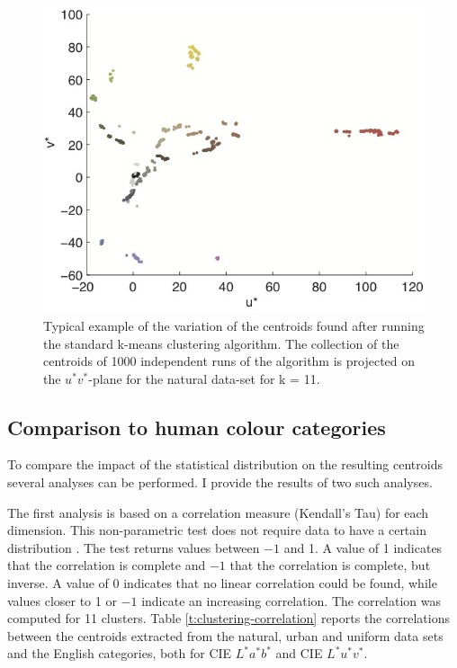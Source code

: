 \begin{figure}[htbp]
\centering
\includegraphics[width=.7\textwidth]{./experiments/figures/clustering-first.jpg}
\caption[Example of the variation of the centroids found by the
k-means clustering algorithm]{Typical example of the variation of the
  centroids found after running the standard k-means clustering
  algorithm. The collection of the centroids of 1000 independent runs
  of the algorithm is projected on the $u^*v^*$-plane for the natural
  data-set for k = 11.}
\label{f:clustering-first}
\end{figure}

\subsection{Comparison to human colour categories}

To compare the impact of the statistical distribution on the resulting
centroids several analyses can be performed. I provide the results of
two such analyses.

The first analysis is based on a correlation measure (Kendall's Tau)
for each dimension. This non-parametric test does not require data to
have a certain distribution \citep{conover99practical}. The test
returns values between $-1$ and 1. A value of 1 indicates that the
correlation is complete and $-1$ that the correlation is complete, but
inverse. A value of 0 indicates that no linear correlation could be
found, while values closer to 1 or $-1$ indicate an increasing
correlation. The correlation was computed for 11 clusters. Table
\ref{t:clustering-correlation} reports the correlations between the
centroids extracted from the natural, urban and uniform data sets and
the English categories, both for CIE $L^*a^*b^*$ and CIE $L^*u^*v^*$.


